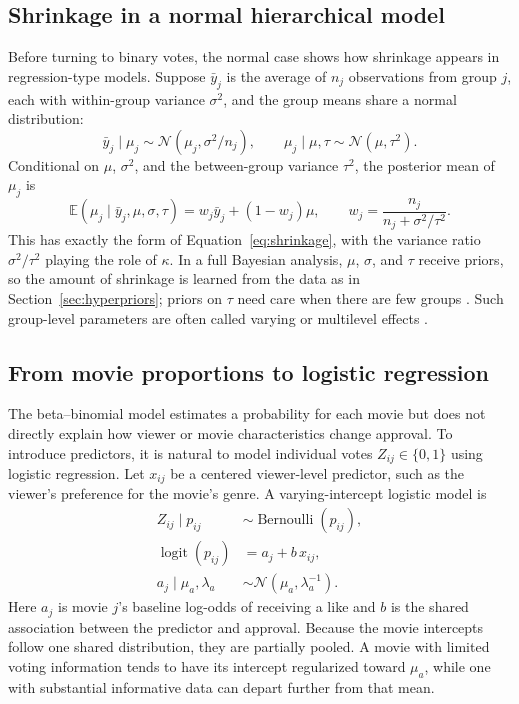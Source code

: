 \documentclass[11pt,a4paper]{article}
\newcommand{\Normal}{\mathcal{N}}
\newcommand{\E}{\mathbb{E}}
\newcommand{\logit}{\operatorname{logit}}
\newcommand{\Bern}{\operatorname{Bernoulli}}
\begin{document}
\subsection{Shrinkage in a normal hierarchical model}
Before turning to binary votes, the normal case shows how shrinkage appears in regression-type models. Suppose $\bar y_j$ is the average of $n_j$ observations from group $j$, each with within-group variance $\sigma^2$, and the group means share a normal distribution:
\begin{equation}
 \bar y_j\mid\mu_j\sim\Normal(\mu_j,\sigma^2/n_j),\qquad
 \mu_j\mid\mu,\tau\sim\Normal(\mu,\tau^2).
 \label{eq:normal-normal}
\end{equation}
Conditional on $\mu$, $\sigma^2$, and the between-group variance $\tau^2$, the posterior mean of $\mu_j$ is
\begin{equation}
 \E(\mu_j\mid\bar y_j,\mu,\sigma,\tau)
 =w_j\bar y_j+(1-w_j)\mu,\qquad
 w_j=\frac{n_j}{n_j+\sigma^2/\tau^2}.
 \label{eq:normal-shrinkage}
\end{equation}
This has exactly the form of Equation~\eqref{eq:shrinkage}, with the variance ratio $\sigma^2/\tau^2$ playing the role of $\kappa$. In a full Bayesian analysis, $\mu$, $\sigma$, and $\tau$ receive priors, so the amount of shrinkage is learned from the data as in Section~\ref{sec:hyperpriors}; priors on $\tau$ need care when there are few groups \cite{gelman2006}. Such group-level parameters are often called varying or multilevel effects \cite{gelmanhill2007}.

\subsection{From movie proportions to logistic regression}
The beta--binomial model estimates a probability for each movie but does not directly explain how viewer or movie characteristics change approval. To introduce predictors, it is natural to model individual votes $Z_{ij}\in\{0,1\}$ using logistic regression. Let $x_{ij}$ be a centered viewer-level predictor, such as the viewer's preference for the movie's genre. A varying-intercept logistic model is
\begin{align}
 Z_{ij}\mid p_{ij}&\sim\Bern(p_{ij}),\label{eq:logistic-likelihood}\\
 \logit(p_{ij})&=a_j+b\,x_{ij},\label{eq:logistic-eta}\\
 a_j\mid\mu_a,\lambda_a&\sim\Normal(\mu_a,\lambda_a^{-1}).
 \label{eq:logistic-hierarchy}
\end{align}
Here $a_j$ is movie $j$'s baseline log-odds of receiving a like and $b$ is the shared association between the predictor and approval. Because the movie intercepts follow one shared distribution, they are partially pooled. A movie with limited voting information tends to have its intercept regularized toward $\mu_a$, while one with substantial informative data can depart further from that mean.
\end{document}
